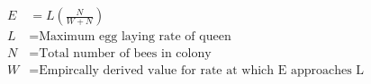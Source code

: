 \documentclass[fleqn, oneside, 11pt]{article}
\begin{document}
\begin{preview}
\begin{align*}
E & = L \left(\frac{N}{W + N}\right) \nonumber \\
L & =  \text{Maximum egg laying rate of queen} \nonumber \\
N & =  \text{Total number of bees in colony} \nonumber \\
W & =  \text{Empircally derived value for rate at which E approaches L} \nonumber \\
\end{align*} 
\end{preview}
\end{document}

